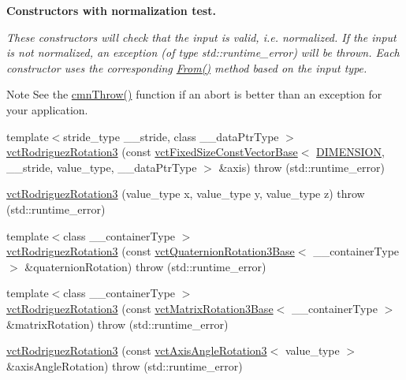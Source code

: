 \begin{Indent}{\bf Constructors with normalization test.}\par
{\em These constructors will check that the input is valid, i.\+e. normalized. If the input is not normalized, an exception (of type {\ttfamily std\+::runtime\+\_\+error}) will be thrown. Each constructor uses the corresponding \hyperlink{classvct_rodriguez_rotation3_base_aff389cf931841e2766d345425de672ea}{From()} method based on the input type.

\begin{DoxyNote}{Note}
See the \hyperlink{_minimal_cmn_8h_ad50e82cf9c9dbd0e6443c13e0d1a6f1a}{cmn\+Throw()} function if an {\ttfamily abort} is better than an exception for your application. 
\end{DoxyNote}
}\begin{DoxyCompactItemize}
\item 
{\footnotesize template$<$stride\+\_\+type \+\_\+\+\_\+stride, class \+\_\+\+\_\+data\+Ptr\+Type $>$ }\\\hyperlink{classvct_rodriguez_rotation3_a0fd3d7d1006135d82e8e729542c4009f}{vct\+Rodriguez\+Rotation3} (const \hyperlink{classvct_fixed_size_const_vector_base}{vct\+Fixed\+Size\+Const\+Vector\+Base}$<$ \hyperlink{group__cisst_vector_gga7a58a7aa413585bc569bcf1f22656ae3a8bdaaaae91a14fa58479067f59ed9145}{D\+I\+M\+E\+N\+S\+I\+O\+N}, \+\_\+\+\_\+stride, value\+\_\+type, \+\_\+\+\_\+data\+Ptr\+Type $>$ \&axis)  throw (std\+::runtime\+\_\+error)
\item 
\hyperlink{classvct_rodriguez_rotation3_a63755a8e0e70b1ebe0e96a06481052f1}{vct\+Rodriguez\+Rotation3} (value\+\_\+type x, value\+\_\+type y, value\+\_\+type z)  throw (std\+::runtime\+\_\+error)
\item 
{\footnotesize template$<$class \+\_\+\+\_\+container\+Type $>$ }\\\hyperlink{classvct_rodriguez_rotation3_abd497e6d94f792ba40805716af2e2a08}{vct\+Rodriguez\+Rotation3} (const \hyperlink{classvct_quaternion_rotation3_base}{vct\+Quaternion\+Rotation3\+Base}$<$ \+\_\+\+\_\+container\+Type $>$ \&quaternion\+Rotation)  throw (std\+::runtime\+\_\+error)
\item 
{\footnotesize template$<$class \+\_\+\+\_\+container\+Type $>$ }\\\hyperlink{classvct_rodriguez_rotation3_a553610f7175091ae74bae7a211bef8e9}{vct\+Rodriguez\+Rotation3} (const \hyperlink{classvct_matrix_rotation3_base}{vct\+Matrix\+Rotation3\+Base}$<$ \+\_\+\+\_\+container\+Type $>$ \&matrix\+Rotation)  throw (std\+::runtime\+\_\+error)
\item 
\hyperlink{classvct_rodriguez_rotation3_a7cc0047e4f2d7b35548d742deed11b6a}{vct\+Rodriguez\+Rotation3} (const \hyperlink{classvct_axis_angle_rotation3}{vct\+Axis\+Angle\+Rotation3}$<$ value\+\_\+type $>$ \&axis\+Angle\+Rotation)  throw (std\+::runtime\+\_\+error)
\end{DoxyCompactItemize}
\end{Indent}
